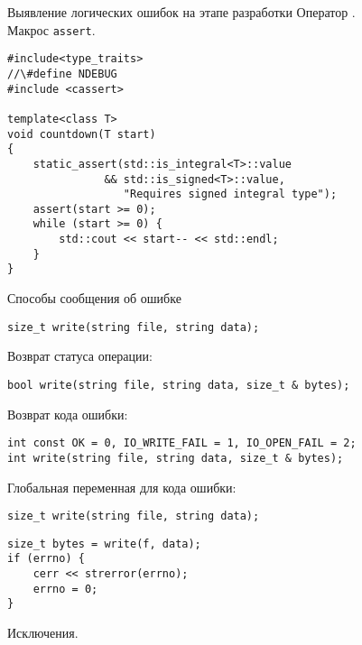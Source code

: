 \documentclass{beamer}
\begin{document}
\begin{frame}[fragile]{Выявление логических ошибок на этапе разработки}
    \fakeitem Оператор .\\
    \fakeitem Макрос \texttt{assert}.
    \begin{lstlisting}
#include<type_traits>
//\#define NDEBUG
#include <cassert>

template<class T> 
void countdown(T start) 
{
    static_assert(std::is_integral<T>::value
               && std::is_signed<T>::value, 
                  "Requires signed integral type");
    assert(start >= 0);
    while (start >= 0) {
        std::cout << start-- << std::endl;
    }
}
    \end{lstlisting}
\end{frame}

\begin{frame}[fragile]{Способы сообщения об ошибке}
\small
    \begin{lstlisting}
size_t write(string file, string data);
    \end{lstlisting}

        \pause\fakeitem Возврат статуса операции:
    \begin{lstlisting}
bool write(string file, string data, size_t & bytes);
    \end{lstlisting}

        \pause\fakeitem Возврат кода ошибки:
    \begin{lstlisting}
int const OK = 0, IO_WRITE_FAIL = 1, IO_OPEN_FAIL = 2;
int write(string file, string data, size_t & bytes);
    \end{lstlisting}

        \pause\fakeitem Глобальная переменная для кода ошибки:
    \begin{lstlisting}
size_t write(string file, string data);
    \end{lstlisting}

    \begin{lstlisting}
size_t bytes = write(f, data);
if (errno) {
    cerr << strerror(errno);
    errno = 0;
}
\end{lstlisting}
\pause\fakeitem Исключения.
\end{frame}
\end{document}
